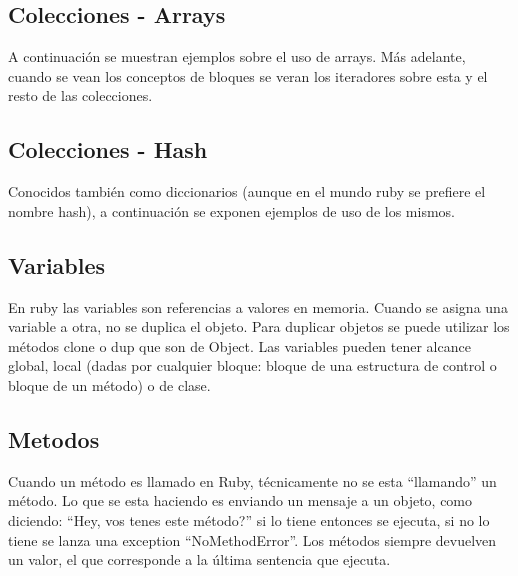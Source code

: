 \documentclass{article}
\begin{document}
 
\bigskip


\subsection{Colecciones - Arrays}
A continuación se muestran ejemplos sobre el uso de arrays. Más adelante, cuando se vean los conceptos de bloques se veran los iteradores sobre esta y el resto de las colecciones.

 
\bigskip

\subsection{Colecciones - Hash}
Conocidos también como diccionarios (aunque en el mundo ruby se prefiere el nombre hash), a continuación se exponen ejemplos de uso de los mismos.

 
\bigskip

\subsection{Variables}
En ruby las variables son referencias a valores en memoria. Cuando se asigna una variable a otra, no se duplica el objeto. Para duplicar objetos se puede utilizar los métodos clone o dup que son de Object.
Las variables pueden tener alcance global, local (dadas por cualquier bloque: bloque de una estructura de control o bloque de un método) o de clase.

 
\bigskip

\subsection{Metodos}

Cuando un método es llamado en Ruby, técnicamente no se esta “llamando” un método. Lo que se esta haciendo es enviando un mensaje a un objeto, como diciendo: “Hey, vos tenes este método?” si lo tiene entonces se ejecuta, si no lo tiene se lanza una exception “NoMethodError”.
Los métodos siempre devuelven un valor, el que corresponde a la última sentencia que ejecuta. 
\end{document}
